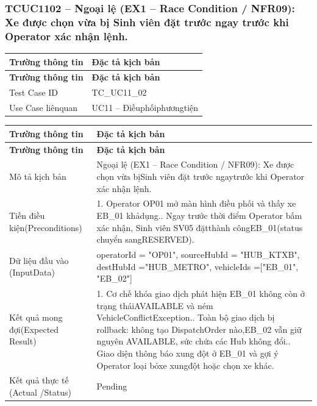 \subsubsection{TCUC1102 – Ngoại lệ (EX1 – Race Condition / NFR09): Xe được chọn vừa bị Sinh viên đặt trước ngay trước khi Operator xác nhận lệnh.}
\begin{longtable}{|L{0.24\textwidth}|L{0.70\textwidth}|}
\hline
\textbf{Trường thông tin} & \textbf{Đặc tả kịch bản} \\
\hline
\endfirsthead
\hline
\textbf{Trường thông tin} & \textbf{Đặc tả kịch bản} \\
\hline
\endhead
Test Case ID & TC\_UC11\_02 \\
\hline
Use Case liênquan & UC11 – Điềuphốiphươngtiện \\
\hline
\end{longtable}
\vspace{-0.5\baselineskip}
\begin{longtable}{|L{0.24\textwidth}|L{0.70\textwidth}|}
\hline
\textbf{Trường thông tin} & \textbf{Đặc tả kịch bản} \\
\hline
\endfirsthead
\hline
\textbf{Trường thông tin} & \textbf{Đặc tả kịch bản} \\
\hline
\endhead
Mô tả kịch bản & Ngoại lệ (EX1 – Race Condition / NFR09): Xe được chọn vừa bị\newline Sinh viên đặt trước ngaytrước khi Operator xác nhận lệnh. \\
\hline
Tiền điều kiện\newline (Preconditions) & 1. Operator OP01 mở màn hình điều phối và thấy xe EB\_01 khả\newline dụng.. Ngay trước thời điểm Operator bấm xác nhận, Sinh viên SV05 đặt\newline thành côngEB\_01(status chuyển sangRESERVED). \\
\hline
Dữ liệu đầu vào (Input\newline Data) & operatorId = "OP01", sourceHubId = "HUB\_KTXB", destHubId =\newline "HUB\_METRO", vehicleIds =["EB\_01", "EB\_02"] \\
\hline
Kết quả mong đợi\newline (Expected Result) & 1. Cơ chế khóa giao dịch phát hiện EB\_01 không còn ở trạng thái\newline AVAILABLE và ném VehicleConflictException.. Toàn bộ giao dịch bị rollback: không tạo DispatchOrder nào,\newline EB\_02 vẫn giữ nguyên AVAILABLE, sức chứa các Hub không đổi.. Giao diện thông báo xung đột ở EB\_01 và gợi ý Operator loại bỏ\newline xe xungđột hoặc chọn xe khác. \\
\hline
Kết quả thực tế (Actual /\newline Status) & Pending \\
\hline
\end{longtable}
\vspace{-0.5\baselineskip}
